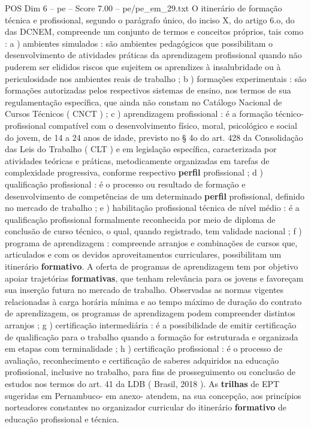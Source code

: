 \begin{textsample}{POS Dim 6 – pe – Score 7.00 – pe/pe\_em\_29.txt}
O itinerário de formação técnica e profissional, segundo o parágrafo único, do inciso X, do artigo 6.o, do das DCNEM, compreende um conjunto de termos e conceitos próprios, tais como : a ) ambientes simulados : são ambientes pedagógicos que possibilitam o desenvolvimento de atividades práticas da aprendizagem profissional quando não puderem ser elididos riscos que sujeitem os aprendizes à insalubridade ou à periculosidade nos ambientes reais de trabalho ; b ) formações experimentais : são formações autorizadas pelos respectivos sistemas de ensino, nos termos de sua regulamentação específica, que ainda não constam no Catálogo Nacional de Cursos Técnicos ( CNCT ) ; c ) aprendizagem profissional : é a formação técnico-profissional compatível com o desenvolvimento físico, moral, psicológico e social do jovem, de 14 a 24 anos de idade, previsto no § 4o do art. 428 da Consolidação das Leis do Trabalho ( CLT ) e em legislação específica, caracterizada por atividades teóricas e práticas, metodicamente organizadas em tarefas de complexidade progressiva, conforme respectivo \textbf{perfil} profissional ; d ) qualificação profissional : é o processo ou resultado de formação e desenvolvimento de competências de um determinado \textbf{perfil} profissional, definido no mercado de trabalho ; e ) habilitação profissional técnica de nível médio : é a qualificação profissional formalmente reconhecida por meio de diploma de conclusão de curso técnico, o qual, quando registrado, tem validade nacional ; f ) programa de aprendizagem : compreende arranjos e combinações de cursos que, articulados e com os devidos aproveitamentos curriculares, possibilitam um itinerário \textbf{formativo}.
A oferta de programas de aprendizagem tem por objetivo apoiar trajetórias \textbf{formativas}, que tenham relevância para os jovens e favoreçam sua inserção futura no mercado de trabalho.
Observadas as normas vigentes relacionadas à carga horária mínima e ao tempo máximo de duração do contrato de aprendizagem, os programas de aprendizagem podem compreender distintos arranjos ; g ) certificação intermediária : é a possibilidade de emitir certificação de qualificação para o trabalho quando a formação for estruturada e organizada em etapas com terminalidade ; h ) certificação profissional : é o processo de avaliação, reconhecimento e certificação de saberes adquiridos na educação profissional, inclusive no trabalho, para fins de prosseguimento ou conclusão de estudos nos termos do art. 41 da LDB ( Brasil, 2018 ).
As \textbf{trilhas} de EPT sugeridas em Pernambuco- em anexo- atendem, na sua concepção, aos princípios norteadores constantes no organizador curricular do itinerário \textbf{formativo} de educação profissional e técnica.

\end{textsample}
